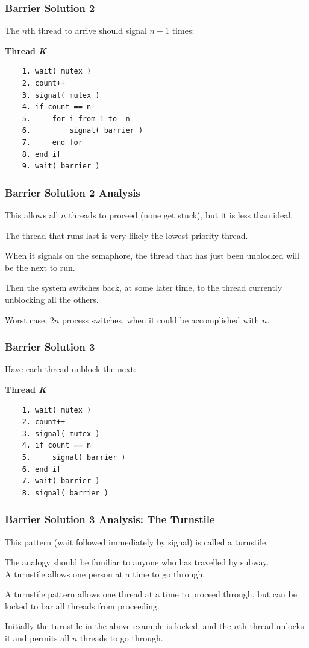 \begin{frame}[fragile]
\frametitle{Barrier Solution 2}

The $n$th thread to arrive should signal $n-1$ times:

\textbf{Thread \textit{K}}\vspace{-6em}
  \begin{verbatim}
	1. wait( mutex )
	2. count++
	3. signal( mutex )
	4. if count == n
	5.     for i from 1 to  n
	6.         signal( barrier )
	7.     end for
	8. end if
	9. wait( barrier )
  \end{verbatim}
\vspace{-2em} 




\end{frame}

\begin{frame}
\frametitle{Barrier Solution 2 Analysis}

This allows all $n$ threads to proceed (none get stuck), but it is less than ideal. 

The thread that runs last is very likely the lowest priority thread.

When it signals on the semaphore, the thread that has just been unblocked will be the next to run.

Then the system switches back, at some later time, to the thread currently unblocking all the others. 

Worst case, $2n$ process switches, when it could be accomplished with $n$.


\end{frame}

\begin{frame}[fragile]
\frametitle{Barrier Solution 3}

Have each thread unblock the next:

\textbf{Thread \textit{K}}\vspace{-6em}
  \begin{verbatim}
	1. wait( mutex )
	2. count++
	3. signal( mutex )
	4. if count == n
	5.     signal( barrier )
	6. end if
	7. wait( barrier )
	8. signal( barrier )
  \end{verbatim}
\vspace{-2em}


\end{frame}

\begin{frame}
\frametitle{Barrier Solution 3 Analysis: The Turnstile}

This pattern (wait followed immediately by signal) is called a \alert{turnstile}.

The analogy should be familiar to anyone who has travelled by subway.\\
\quad A turnstile allows one person at a time to go through. 

A turnstile pattern allows one thread at a time to proceed through, but can be locked to bar all threads from proceeding. 

Initially the turnstile in the above example is locked, and the $n$th thread unlocks it and permits all $n$ threads to go through.

\end{frame}

